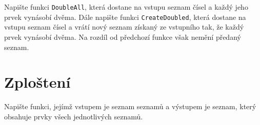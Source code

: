 \documentclass[12pt,a4paper]{article}
\begin{document}
Napište funkci \texttt{DoubleAll}, která dostane na vstupu seznam čísel a
každý jeho prvek vynásobí dvěma. Dále napište funkci \texttt{CreateDoubled},
která dostane na vstupu seznam čísel a vrátí nový seznam získaný ze vstupního
tak, že každý prvek vynásobí dvěma. Na rozdíl od předchozí funkce však nemění
předaný seznam.

\section{Zploštení}

Napište funkci, jejímž vstupem je seznam seznamů a výstupem je seznam, který
obsahuje prvky všech jednotlivých seznamů.





\end{document}
